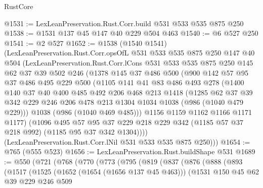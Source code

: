 \begin{lexlean}{RustCore}
\begin{coremodule}
@1531 := LexLeanPreservation.Rust.Corr.build @531 @533 @535 @875 @250
@1538 := @1531 @137 @45 @147 @40 @229 @504 @463
@1540 := @6 @527 @250
@1541 := @2 @527
@1652 := @1538
    (@1540 @1541)
    (LexLeanPreservation.Rust.Corr.opsOfL
      @531
      @533
      @535
      @875
      @250
      @147
      @40
      @504
      (LexLeanPreservation.Rust.Corr.lCons
        @531
        @533
        @535
        @875
        @250
        @145
        @62
        @37
        @39
        @502
        @246
        (@1378
          @145
          @37
          @486
          @500
          (@900
            @142
            @57
            @95
            @37
            @486
            @495
            @229
            @500
            (@1105
              @141
              @41
              @83
              @486
              @493
              @278
              (@1400
                @140
                @37
                @40
                @400
                @485
                @492
                @206
                @468
                @213
                @1418
                (@1285
                  @62
                  @37
                  @39
                  @342
                  @229
                  @246
                  @206
                  @478
                  @213
                  @1304
                  @1034
                  @1038
                  (@986 (@1040 @479 @229)))
                @1038
                (@986 (@1040 @469 @485)))
              @1156
              @1159
              @1162
              @1166
              @1171
              @1177)
            (@1096
              @495
              @57
              @95
              @37
              @229
              @218
              @229
              @342
              (@1185 @57 @37 @218 @992)
              (@1185 @95 @37 @342 @1304))))
        (LexLeanPreservation.Rust.Corr.lNil @531 @533 @535 @875 @250)))
@1654 := @765 (@555 @523)
@1656 := LexLeanPreservation.Rust.buildShape @531
@1689 := @550
    (@721
      (@768
        (@770
          (@773
            (@795
              (@819
                (@837
                  (@876
                    (@888
                      (@893
                        (@1517
                          (@1525
                            (@1652 (@1654 (@1656 @137 @45 @463)))
                            (@1531
                              @150
                              @45
                              @62
                              @39
                              @229
                              @246
                              @509

\end{coremodule}
\end{lexlean}
